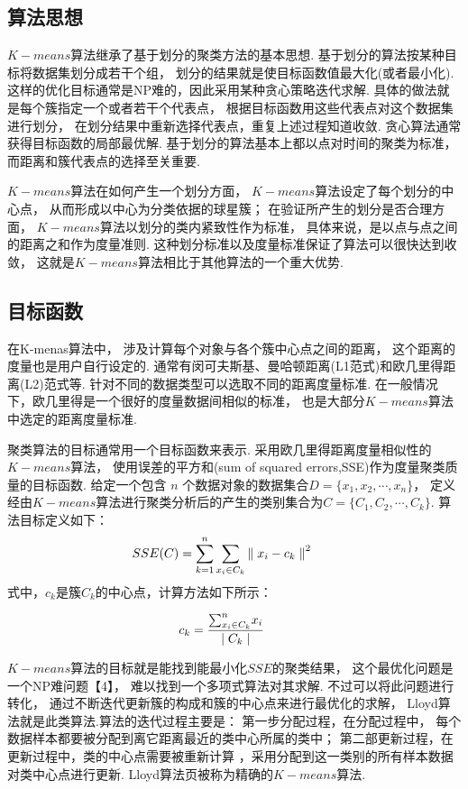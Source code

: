 \documentclass[bachelor,adobefonts]{jnuthesis}
\begin{document}
\subsection{算法思想}
$K-means$算法继承了基于划分的聚类方法的基本思想.
基于划分的算法按某种目标将数据集划分成若干个组，
划分的结果就是使目标函数值最大化(或者最小化).
这样的优化目标通常是NP难的，因此采用某种贪心策略迭代求解.
具体的做法就是每个簇指定一个或者若干个代表点，
根据目标函数用这些代表点对这个数据集进行划分，
在划分结果中重新选择代表点，重复上述过程知道收敛.
贪心算法通常获得目标函数的局部最优解.
基于划分的算法基本上都以点对时间的聚类为标准，
而距离和簇代表点的选择至关重要.

$K-means$算法在如何产生一个划分方面，
$K-means$算法设定了每个划分的中心点，
从而形成以中心为分类依据的球星簇；
在验证所产生的划分是否合理方面，
$K-means$算法以划分的类内紧致性作为标准，
具体来说，是以点与点之间的距离之和作为度量准则.
这种划分标准以及度量标准保证了算法可以很快达到收敛，
这就是$K-means$算法相比于其他算法的一个重大优势.

\subsection{目标函数}
在K-menas算法中，
涉及计算每个对象与各个簇中心点之间的距离，
这个距离的度量也是用户自行设定的.
通常有闵可夫斯基、曼哈顿距离(L1范式)和欧几里得距离(L2)范式等.
针对不同的数据类型可以选取不同的距离度量标准.
在一般情况下，欧几里得是一个很好的度量数据间相似的标准，
也是大部分$K-means$算法中选定的距离度量标准.

聚类算法的目标通常用一个目标函数来表示.
采用欧几里得距离度量相似性的$K-means$算法，
使用误差的平方和(sum of squared errors,SSE)作为度量聚类质量的目标函数.
给定一个包含 $n$ 个数据对象的数据集合$D =\{ x_1, x_2, \cdots, x_n \}$，
定义经由$K-means$算法进行聚类分析后的产生的类别集合为$C=\{ C_1, C_2, \cdots, C_k \}$.
算法目标定义如下：
\begin{equation}
  \centering
  SSE(C) = \sum_{ k=1}^{n} \sum_{x_i \in C_k} {\parallel x_i - c_k \parallel}^2 \qquad 
\end{equation}
式中，$c_k$是簇$C_k$的中心点，计算方法如下所示：

\begin{equation}
  \centering
  c_k = \frac {{\sum_{x_i \in C_k}^{n}} x_i} {\mid C_k \mid} \qquad
\end{equation}

$K-means$算法的目标就是能找到能最小化$SSE$的聚类结果，
这个最优化问题是一个NP难问题【4】，
难以找到一个多项式算法对其求解.
不过可以将此问题进行转化，
通过不断迭代更新簇的构成和簇的中心点来进行最优化的求解，
Lloyd算法就是此类算法.算法的迭代过程主要是：
第一步分配过程，在分配过程中，
每个数据样本都要被分配到离它距离最近的类中心所属的类中；
第二部更新过程，在更新过程中，类的中心点需要被重新计算
，采用分配到这一类别的所有样本数据对类中心点进行更新.
Lloyd算法页被称为精确的$K-means$算法.
\end{document}
